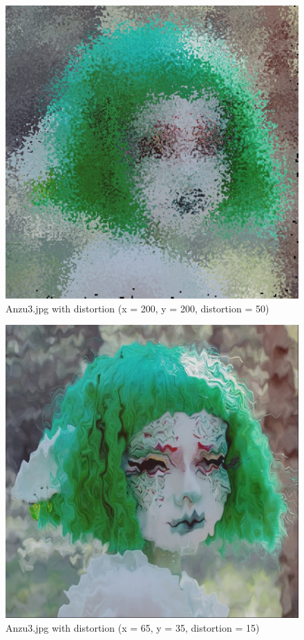 \documentclass[12pt,a4paper]{article}
\begin{document}
    \begin{figure}[!ht]
        \centering
        \includegraphics[scale=0.25]{Anzu-glass.jpg}
        \caption{Anzu3.jpg with distortion (x = 200, y = 200, distortion = 50)}
        \label{Anzu-glass}
    \end{figure}

    \begin{figure}[!ht]
        \centering
        \includegraphics[scale=0.25]{Anzu-watery.jpg}
        \caption{Anzu3.jpg with distortion (x = 65, y = 35, distortion = 15)}
        \label{Anzu-watery}
    \end{figure}
\end{document}
